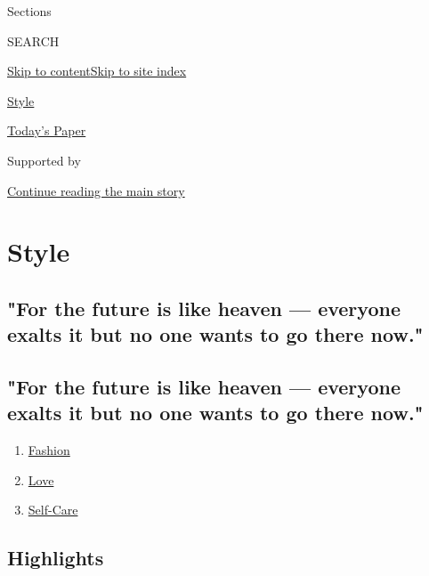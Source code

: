 Sections

SEARCH

\protect\hyperlink{site-content}{Skip to
content}\protect\hyperlink{site-index}{Skip to site index}

\href{https://www.nytimes3xbfgragh.onion/section/style}{Style}

\href{https://myaccount.nytimes3xbfgragh.onion/auth/login?response_type=cookie\&client_id=vi}{}

\href{https://www.nytimes3xbfgragh.onion/section/todayspaper}{Today's
Paper}

Supported by

\protect\hyperlink{after-sponsor}{Continue reading the main story}

\hypertarget{style}{%
\section{Style}\label{style}}

\hypertarget{for-the-future-is-like-heaven--everyone-exalts-it-but-no-one-wants-to-go-there-now}{%
\subsection{"For the future is like heaven --- everyone exalts it but no
one wants to go there
now."}\label{for-the-future-is-like-heaven--everyone-exalts-it-but-no-one-wants-to-go-there-now}}

\hypertarget{for-the-future-is-like-heaven--everyone-exalts-it-but-no-one-wants-to-go-there-now-1}{%
\subsection{"For the future is like heaven --- everyone exalts it but no
one wants to go there
now."}\label{for-the-future-is-like-heaven--everyone-exalts-it-but-no-one-wants-to-go-there-now-1}}

\begin{enumerate}
\def\labelenumi{\arabic{enumi}.}
\tightlist
\item
  \href{/section/fashion}{Fashion}
\item
  \href{/section/style/love}{Love}
\item
  \href{/section/style/self-care}{Self-Care}
\end{enumerate}

\hypertarget{highlights}{%
\subsection{Highlights}\label{highlights}}

